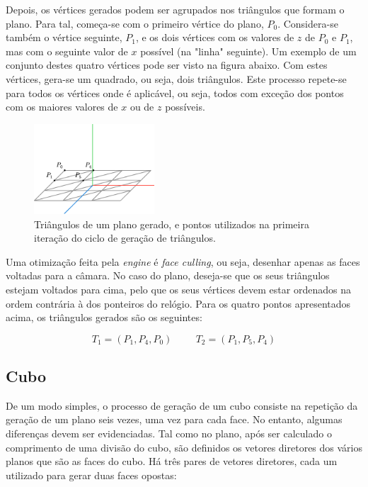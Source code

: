 \documentclass[12pt, a4paper]{article}
\begin{document}
Depois, os vértices gerados podem ser agrupados nos triângulos que formam o plano. Para tal,
começa-se com o primeiro vértice do plano, $P_0$. Considera-se também o vértice seguinte, $P_1$, e
os dois vértices com os valores de $z$ de $P_0$ e $P_1$, mas com o seguinte valor de $x$ possível
(na "linha"{} seguinte). Um exemplo de um conjunto destes quatro vértices pode ser visto na figura
abaixo. Com estes vértices, gera-se um quadrado, ou seja, dois triângulos. Este processo repete-se
para todos os vértices onde é aplicável, ou seja, todos com exceção dos pontos com os maiores
valores de $x$ ou de $z$ possíveis.

\begin{figure}[H]
    \centering
    \includegraphics[width=0.4\textwidth]{res/figures/PlaneTriangles.pdf}
    \caption{
        Triângulos de um plano gerado, e pontos utilizados na primeira iteração do ciclo de geração
        de triângulos.
    }
\end{figure}

Uma otimização feita pela \emph{engine} é \emph{face culling}, ou seja, desenhar apenas as faces
voltadas para a câmara. No caso do plano, deseja-se que os seus triângulos estejam voltados para
cima, pelo que os seus vértices devem estar ordenados na ordem contrária à dos ponteiros do
relógio. Para os quatro pontos apresentados acima, os triângulos gerados são os seguintes:

$$
T_1 = (P_1, P_4, P_0)
\hspace{1cm}
T_2 = (P_1, P_5, P_4)
$$

\subsection{Cubo}

De um modo simples, o processo de geração de um cubo consiste na repetição da geração de um plano
seis vezes, uma vez para cada face. No entanto, algumas diferenças devem ser evidenciadas. Tal como
no plano, após ser calculado o comprimento de uma divisão do cubo, são definidos os vetores
diretores dos vários planos que são as faces do cubo. Há três pares de vetores diretores, cada um
utilizado para gerar duas faces opostas:
\end{document}
